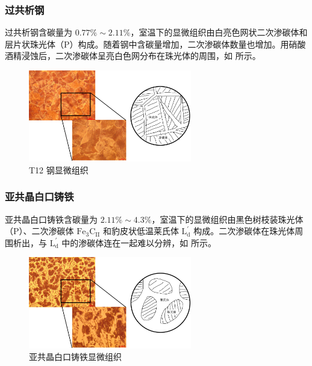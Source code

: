 \documentclass[a4paper,utf8]{article}
\begin{document}
        \subsubsection{过共析钢}
            过共析钢含碳量为 $0.77\%\sim 2.11\%$，室温下的显微组织由白亮色网状二次渗碳体和层片状珠光体（P）构成。随着钢中含碳量增加，二次渗碳体数量也增加。用硝酸酒精浸蚀后，二次渗碳体呈亮白色网分布在珠光体的周围，如 所示。
            \begin{figure}[!ht]
                \includegraphics[height=40mm]{result/4.pdf}
                \caption{T12 钢显微组织\label{fig:4}}
            \end{figure}

        \subsubsection{亚共晶白口铸铁}
            亚共晶白口铸铁含碳量为 $2.11\%\sim 4.3\%$，室温下的显微组织由黑色树枝装珠光体（P）、二次渗碳体 $\text{Fe}_3\text{C}_\text{II}$ 和豹皮状低温莱氏体 $\text{L}_\text{d}^{'}$ 构成。二次渗碳体在珠光体周围析出，与 $\text{L}_\text{d}^{'}$ 中的渗碳体连在一起难以分辨，如 所示。
            \begin{figure}[!ht]
                \includegraphics[height=40mm]{result/5.pdf}
                \caption{亚共晶白口铸铁显微组织\label{fig:5}}
            \end{figure}
\end{document}
